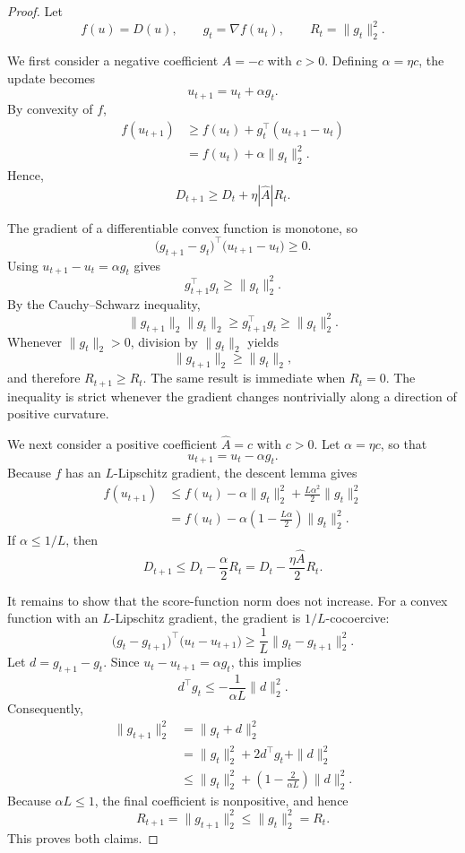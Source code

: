 \documentclass[sigconf,anonymous,review]{acmart}
\theoremstyle{acmdefinition}
\begin{document}
\begin{proof}
Let
\[
    f(u)=D(u),
    \qquad
    g_t=\nabla f(u_t),
    \qquad
    R_t=\|g_t\|_2^2.
\]

We first consider a negative coefficient
$\widehat{A}=-c$ with $c>0$. Defining
$\alpha=\eta c$, the update becomes
\[
    u_{t+1}
    =
    u_t+\alpha g_t.
\]
By convexity of $f$,
\begin{align}
    f(u_{t+1})
    &\geq
    f(u_t)
    +
    g_t^\top(u_{t+1}-u_t) \\
    &=
    f(u_t)+\alpha\|g_t\|_2^2.
\end{align}
Hence,
\[
    D_{t+1}
    \geq
    D_t+\eta|\widehat{A}|R_t.
\]

The gradient of a differentiable convex function is monotone, so
\[
    \bigl(g_{t+1}-g_t\bigr)^\top
    \bigl(u_{t+1}-u_t\bigr)
    \geq0.
\]
Using $u_{t+1}-u_t=\alpha g_t$ gives
\[
    g_{t+1}^\top g_t
    \geq
    \|g_t\|_2^2.
\]
By the Cauchy--Schwarz inequality,
\[
    \|g_{t+1}\|_2\|g_t\|_2
    \geq
    g_{t+1}^\top g_t
    \geq
    \|g_t\|_2^2.
\]
Whenever $\|g_t\|_2>0$, division by $\|g_t\|_2$ yields
\[
    \|g_{t+1}\|_2
    \geq
    \|g_t\|_2,
\]
and therefore $R_{t+1}\geq R_t$. The same result is immediate when
$R_t=0$. The inequality is strict whenever the gradient changes
nontrivially along a direction of positive curvature.

We next consider a positive coefficient
$\widehat{A}=c$ with $c>0$. Let
$\alpha=\eta c$, so that
\[
    u_{t+1}
    =
    u_t-\alpha g_t.
\]
Because $f$ has an $L$-Lipschitz gradient, the descent lemma gives
\begin{align}
    f(u_{t+1})
    &\leq
    f(u_t)
    -
    \alpha\|g_t\|_2^2
    +
    \frac{L\alpha^2}{2}\|g_t\|_2^2 \\
    &=
    f(u_t)
    -
    \alpha
    \left(
        1-\frac{L\alpha}{2}
    \right)
    \|g_t\|_2^2.
\end{align}
If $\alpha\leq1/L$, then
\[
    D_{t+1}
    \leq
    D_t-\frac{\alpha}{2}R_t
    =
    D_t-\frac{\eta\widehat{A}}{2}R_t.
\]

It remains to show that the score-function norm does not increase.
For a convex function with an $L$-Lipschitz gradient, the gradient is
$1/L$-cocoercive:
\[
    \bigl(g_t-g_{t+1}\bigr)^\top
    \bigl(u_t-u_{t+1}\bigr)
    \geq
    \frac{1}{L}
    \|g_t-g_{t+1}\|_2^2.
\]
Let $d=g_{t+1}-g_t$. Since
$u_t-u_{t+1}=\alpha g_t$, this implies
\[
    d^\top g_t
    \leq
    -
    \frac{1}{\alpha L}
    \|d\|_2^2.
\]
Consequently,
\begin{align}
    \|g_{t+1}\|_2^2
    &=
    \|g_t+d\|_2^2 \\
    &=
    \|g_t\|_2^2
    +
    2d^\top g_t
    +
    \|d\|_2^2 \\
    &\leq
    \|g_t\|_2^2
    +
    \left(
        1-\frac{2}{\alpha L}
    \right)
    \|d\|_2^2.
\end{align}
Because $\alpha L\leq1$, the final coefficient is nonpositive, and hence
\[
    R_{t+1}
    =
    \|g_{t+1}\|_2^2
    \leq
    \|g_t\|_2^2
    =
    R_t.
\]
This proves both claims.
\end{proof}
\end{document}
